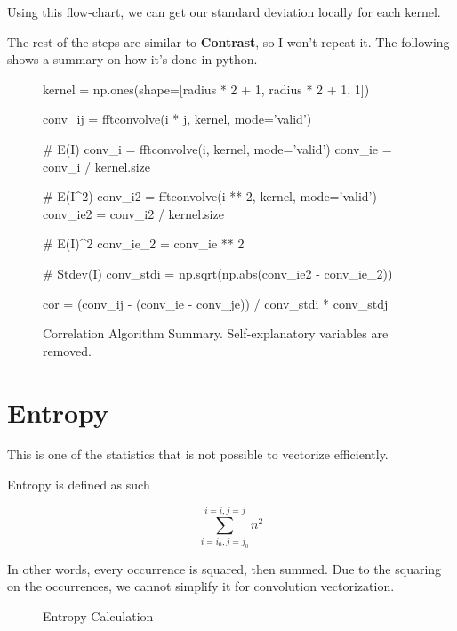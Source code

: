 \documentclass[article,oneside]{memoir}
\begin{document}
Using this flow-chart, we can get our standard deviation locally for each kernel.

The rest of the steps are similar to \textbf{Contrast}, so I won't repeat it. The following shows a summary on how it's done in python.

\begin{figure}[H]
\begin{python}
kernel = np.ones(shape=[radius * 2 + 1, radius * 2 + 1, 1])

conv_ij = fftconvolve(i * j, kernel, mode='valid')

# E(I) 
conv_i = fftconvolve(i, kernel, mode='valid')
conv_ie = conv_i / kernel.size

# E(I^2)
conv_i2 = fftconvolve(i ** 2, kernel, mode='valid')
conv_ie2 = conv_i2 / kernel.size

# E(I)^2
conv_ie_2 = conv_ie ** 2

# Stdev(I)
conv_stdi = np.sqrt(np.abs(conv_ie2 - conv_ie_2))

cor = (conv_ij - (conv_ie - conv_je)) / conv_stdi * conv_stdj
\end{python}

\caption{Correlation Algorithm Summary. Self-explanatory variables are removed.}
\label{Correlation Algorithm Summary}
\end{figure}

\section{Entropy}

This is one of the statistics that is not possible to vectorize efficiently.

Entropy is defined as such

$$\sum_{i=i_0,j=j_0}^{i=i,j=j} n^2$$

In other words, every occurrence is squared, then summed. Due to the squaring on the occurrences, we cannot simplify it for convolution vectorization.

\begin{figure}[H]
\centering
{}
\caption{Entropy Calculation}
\label{Entropy Calculation}
\end{figure}
\end{document}
